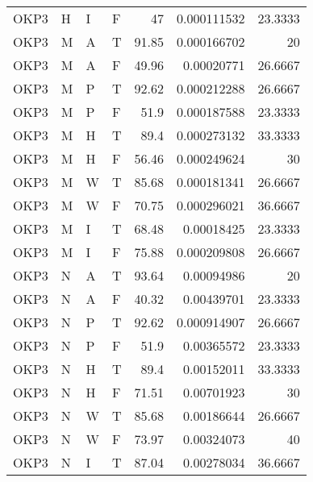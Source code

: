\begin{longtable}{llllrrr}
    OKP3     & H         & I         & F          & 47         & 0.000111532 & 23.3333  \\
    OKP3     & M         & A         & T          & 91.85      & 0.000166702 & 20       \\
    OKP3     & M         & A         & F          & 49.96      & 0.00020771  & 26.6667  \\
    OKP3     & M         & P         & T          & 92.62      & 0.000212288 & 26.6667  \\
    OKP3     & M         & P         & F          & 51.9       & 0.000187588 & 23.3333  \\
    OKP3     & M         & H         & T          & 89.4       & 0.000273132 & 33.3333  \\
    OKP3     & M         & H         & F          & 56.46      & 0.000249624 & 30       \\
    OKP3     & M         & W         & T          & 85.68      & 0.000181341 & 26.6667  \\
    OKP3     & M         & W         & F          & 70.75      & 0.000296021 & 36.6667  \\
    OKP3     & M         & I         & T          & 68.48      & 0.00018425  & 23.3333  \\
    OKP3     & M         & I         & F          & 75.88      & 0.000209808 & 26.6667  \\
    OKP3     & N         & A         & T          & 93.64      & 0.00094986  & 20       \\
    OKP3     & N         & A         & F          & 40.32      & 0.00439701  & 23.3333  \\
    OKP3     & N         & P         & T          & 92.62      & 0.000914907 & 26.6667  \\
    OKP3     & N         & P         & F          & 51.9       & 0.00365572  & 23.3333  \\
    OKP3     & N         & H         & T          & 89.4       & 0.00152011  & 33.3333  \\
    OKP3     & N         & H         & F          & 71.51      & 0.00701923  & 30       \\
    OKP3     & N         & W         & T          & 85.68      & 0.00186644  & 26.6667  \\
    OKP3     & N         & W         & F          & 73.97      & 0.00324073  & 40       \\
    OKP3     & N         & I         & T          & 87.04      & 0.00278034  & 36.6667  \\

\end{longtable}
